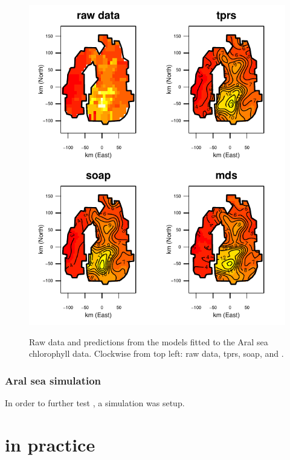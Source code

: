 \begin{figure}
\centering
\includegraphics{mds/figs/aral-fit.pdf} \\
\caption{Raw data and predictions from the models fitted to the Aral sea chlorophyll data. Clockwise from top left: raw data, tprs, soap, and \mdsap.}
\label{aral-fit}
\end{figure}



\subsubsection{Aral sea simulation}

In order to further test \mdsap, a simulation was setup. 


\section{\mdsap in practice}

